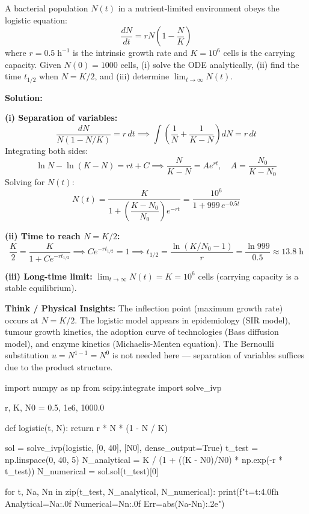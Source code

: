 \begin{psctexample}
A bacterial population $N(t)$ in a nutrient-limited environment obeys the logistic equation:
\begin{equation}
\frac{dN}{dt} = rN\!\left(1 - \frac{N}{K}\right)
\end{equation}
where $r = 0.5\;\text{h}^{-1}$ is the intrinsic growth rate and $K = 10^6$ cells is the carrying capacity. Given $N(0) = 1000$ cells, (i) solve the ODE analytically, (ii) find the time $t_{1/2}$ when $N = K/2$, and (iii) determine $\lim_{t\to\infty} N(t)$.

\textbf{Solution:}

\textbf{(i) Separation of variables:}
\begin{equation}
\frac{dN}{N(1 - N/K)} = r\,dt \implies \int\!\left(\frac{1}{N} + \frac{1}{K - N}\right)\!dN = r\,dt
\end{equation}
Integrating both sides:
\begin{equation}
\ln N - \ln(K - N) = rt + C \implies \frac{N}{K - N} = Ae^{rt}, \quad A = \frac{N_0}{K - N_0}
\end{equation}
Solving for $N(t)$:
\begin{equation}
\boxed{N(t) = \frac{K}{1 + \left(\dfrac{K - N_0}{N_0}\right)e^{-rt}} = \frac{10^6}{1 + 999\,e^{-0.5t}}}
\end{equation}

\textbf{(ii) Time to reach $N = K/2$:}
\begin{equation}
\frac{K}{2} = \frac{K}{1 + Ce^{-rt_{1/2}}} \implies Ce^{-rt_{1/2}} = 1 \implies t_{1/2} = \frac{\ln(K/N_0 - 1)}{r} = \frac{\ln 999}{0.5} \approx 13.8\;\text{h}
\end{equation}

\textbf{(iii) Long-time limit:} $\lim_{t\to\infty} N(t) = K = 10^6$ cells (carrying capacity is a stable equilibrium).

\textbf{\color{rbruNavy}Think / Physical Insights:}
The inflection point (maximum growth rate) occurs at $N = K/2$. The logistic model appears in epidemiology (SIR model), tumour growth kinetics, the adoption curve of technologies (Bass diffusion model), and enzyme kinetics (Michaelis-Menten equation). The Bernoulli substitution $u = N^{1-1} = N^0$ is not needed here — separation of variables suffices due to the product structure.
\qedexam
\end{psctexample}

\begin{pythonbox}
import numpy as np
from scipy.integrate import solve_ivp

r, K, N0 = 0.5, 1e6, 1000.0

def logistic(t, N):
    return r * N * (1 - N / K)

sol = solve_ivp(logistic, [0, 40], [N0], dense_output=True)
t_test = np.linspace(0, 40, 5)
N_analytical = K / (1 + ((K - N0)/N0) * np.exp(-r * t_test))
N_numerical  = sol.sol(t_test)[0]

for t, Na, Nn in zip(t_test, N_analytical, N_numerical):
    print(f"t={t:4.0f}h  Analytical={Na:.0f}  Numerical={Nn:.0f}  Err={abs(Na-Nn):.2e}")
\end{pythonbox}

